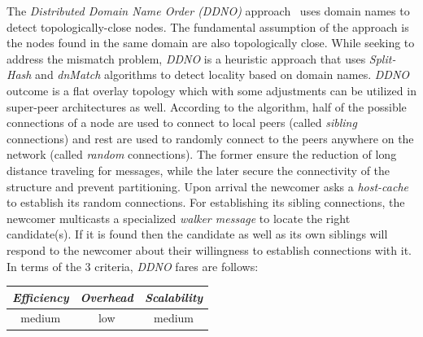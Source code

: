 The \emph{Distributed Domain Name Order (DDNO)} approach~\cite{Z-YK2005} 
uses domain names to detect topologically-close nodes.
The fundamental assumption of the approach is the nodes found in 
the same domain are also topologically close.
While seeking to address the mismatch problem, \emph{DDNO} 
is a heuristic approach that uses
\emph{Split-Hash} and \emph{dnMatch} algorithms 
to detect locality based on domain names. 
\emph{DDNO} outcome is 
a flat overlay topology which with some adjustments 
can be utilized in super-peer architectures as well. 
According to the algorithm,
half of the possible connections of a node are used to connect to local peers
(called \emph{sibling} connections) and rest are used to randomly
connect to the peers anywhere on the network 
(called \emph{random} connections).
The former ensure the reduction of long distance traveling for messages, while
the later secure the connectivity of the structure and prevent partitioning.
Upon arrival the newcomer asks a \emph{host-cache} to establish its
random connections. 
For establishing its sibling connections, the newcomer
multicasts a specialized \emph{walker message} to 
locate the right candidate(s). 
If it is found then the candidate as well as its own siblings will
respond to the newcomer about their willingness to establish connections with
it.
In terms of the $3$ criteria, \emph{DDNO} fares are follows:
\begin{center}
{\footnotesize
\begin{tabular}{ccc}
\emph{Efficiency} & \emph{Overhead} & \emph{Scalability} \\
\hline
medium &
low &
medium
\end{tabular}
}
\end{center}

